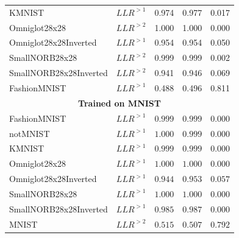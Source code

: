 \begin{frame}
\begin{columns}
\begin{column}{0.55\textwidth}
\begin{table}[t]
{\begin{tabular}{llrrr}
                    KMNIST                   &  $LLR^{>1}$            &  0.974  &  0.977  &  0.017 \\
                    Omniglot28x28            &  $LLR^{>2}$            &  1.000  &  1.000  &  0.000 \\
                    Omniglot28x28Inverted    &  $LLR^{>1}$            &  0.954  &  0.954  &  0.050 \\
                    SmallNORB28x28           &  $LLR^{>2}$            &  0.999  &  0.999  &  0.002 \\
                    SmallNORB28x28Inverted   &  $LLR^{>2}$            &  0.941  &  0.946  &  0.069 \\
    {\color{black!60}FashionMNIST}             &  $LLR^{>1}$            &  0.488  &  0.496  &  0.811 \\
                    \midrule
                    \multicolumn{5}{c}{\textbf{Trained on MNIST}} \\
                    \midrule
                    FashionMNIST                   &  $LLR^{>1}$  &  $0.999$  &  $0.999$  &  $0.000$ \\
                    notMNIST                       &  $LLR^{>1}$  &  $1.000$  &  $0.999$  &  $0.000$ \\
                    KMNIST                         &  $LLR^{>1}$  &  $0.999$  &  $0.999$  &  $0.000$ \\
                    Omniglot28x28                  &  $LLR^{>1}$  &  $1.000$  &  $1.000$  &  $0.000$ \\
                    Omniglot28x28Inverted          &  $LLR^{>1}$  &  $0.944$  &  $0.953$  &  $0.057$ \\
                    SmallNORB28x28                 &  $LLR^{>1}$  &  $1.000$  &  $1.000$  &  $0.000$ \\
                    SmallNORB28x28Inverted         &  $LLR^{>1}$  &  $0.985$  &  $0.987$  &  $0.000$ \\
    {\color{black!60}MNIST}                          &  $LLR^{>2}$  &  $0.515$  &  $0.507$  &  $0.792$ \\
                    \bottomrule
                \end{tabular}
                }
            \end{table}
            \hfill
        \end{column}
    \end{columns}
\end{frame}




